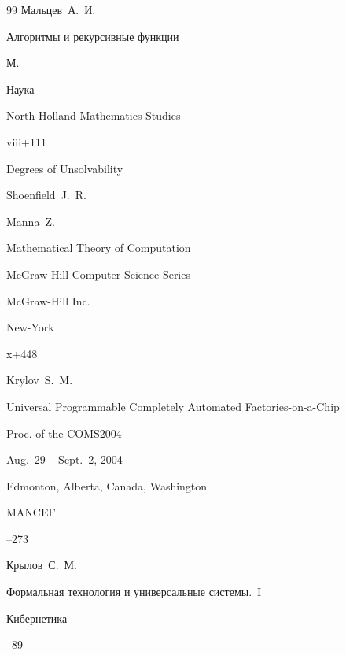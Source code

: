 \begin{thebibliography}{99}
\by Мальцев~А.~И.

\book Алгоритмы и рекурсивные функции

\publaddr М.

\publ Наука






\serial North-Holland Mathematics Studies


\totalpages viii+111 


\book Degrees of Unsolvability

\by Shoenfield~J.~R. 




\by Manna~Z.

\book Mathematical Theory of Computation

\serial McGraw-Hill Computer Science Series

\publ  McGraw-Hill Inc.

\publaddr New-York


\totalpages x+448




\by Krylov~S.~M.

\paper Universal Programmable Completely Automated Factories-on-a-Chip

\inbook Proc. of the COMS2004

\procinfo Aug.~29 -- Sept.~2, 2004


\publaddr Edmonton, Alberta, Canada, Washington

\publ MANCEF


--273




\by Крылов~С.~М.

\paper Формальная технология и универсальные системы.~I

\jour Кибернетика



--89




\end{thebibliography}
